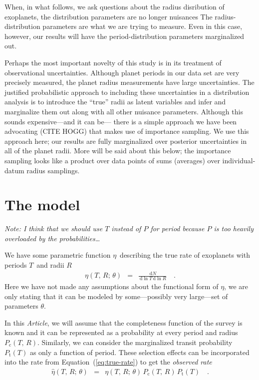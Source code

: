 \documentclass[12pt,preprint]{aastex}
\newcommand{\paper}{\emph{Article}}
\newcommand{\Eq}[1]{Equation~(\ref{eq:#1})}
\newcommand{\eq}[1]{\Eq{#1}}
\newcommand{\eqlabel}[1]{\label{eq:#1}}
\newcommand{\dd}{\ensuremath{\,\mathrm{d}}}
\newcommand{\rate}{\ensuremath{\eta}}
\newcommand{\ratepars}{\ensuremath{\theta}}
\newcommand{\obs}[1]{\ensuremath{\hat{#1}}}
\newcommand{\radius}{\ensuremath{R}}
\newcommand{\period}{\ensuremath{T}}
\newcommand{\completeness}{\ensuremath{P_\mathrm{c}}}
\newcommand{\transitprob}{\ensuremath{P_\mathrm{t}}}
\begin{document}
When, in what follows, we ask questions about the radius disribution of exoplanets,
  the distribution parameters are no longer nuisances
The radius-distribution parameters are what we are trying to measure.
Even in this case, however, our results will have the period-distribution parameters marginalized out.

Perhaps the most important novelty of this study is in its treatment of observational uncertainties.
Although planet periods in our data set are very precisely measured,
  the planet radius measurements have large uncertainties.
The justified probabilistic approach to including these uncertainties in a distribution analysis
  is to introduce the ``true'' radii as latent variables and infer and marginalize them out
  along with all other nuisance parameters.
Although this sounds expensive---and it can be---%
  there is a simple approach we have been advocating (CITE HOGG) that makes use of importance sampling.
We use this approach here;
  our results are fully marginalized over posterior uncertainties in all of the planet radii.
More will be said about this below;
  the importance sampling looks like a product over data points
  of sums (averages) over individual-datum radius samplings.

\section{The model}

\emph{Note: I think that we should use $T$ instead of $P$ for period because
$P$ is too heavily overloaded by the probabilities\ldots}

We have some parametric function \rate\ describing the true rate of exoplanets
with periods \period\ and radii \radius
\begin{eqnarray}\eqlabel{true-rate}
\rate (\period,\,\radius;\,\ratepars)
&=& \frac{\dd N}{\dd\ln\period\dd\ln\radius}\quad.
\end{eqnarray}
Here we have not made any assumptions about the functional form of \rate, we
are only stating that it can be modeled by some---possibly very large---set of
parameters \ratepars.

In this \paper, we will assume that the completeness function of the survey is
known and it can be represented as a probability at every period and radius
$\completeness (\period,\,\radius)$.
Similarly, we can consider the marginalized transit probability $\transitprob
(\period)$ as only a function of period.
These selection effects can be incorporated into the rate from \eq{true-rate}
to get the \emph{observed rate}
\begin{eqnarray}\eqlabel{obs-rate}
\obs{\rate} (\period,\,\radius;\,\ratepars)
&=& \rate (\period,\,\radius;\,\ratepars)\,\completeness(\period,\,\radius)\,
\transitprob(\period)\quad.
\end{eqnarray}
\end{document}
